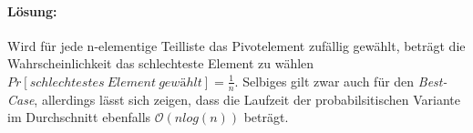 \paragraph{Lösung:}
Wird für jede n-elementige Teilliste das Pivotelement zufällig gewählt, beträgt die Wahrscheinlichkeit das schlechteste Element zu wählen $Pr[schlechtestes\ Element\ gewählt] = \frac{1}{n}$.
Selbiges gilt zwar auch für den \emph{Best-Case}, allerdings lässt sich zeigen, dass die Laufzeit der probabilsitischen Variante im Durchschnitt ebenfalls $\mathcal{O}(nlog(n))$ beträgt. \cite{knuth}








